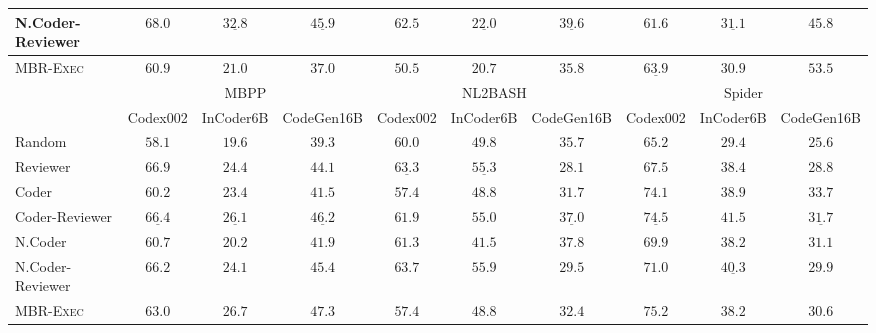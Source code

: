 \documentclass[nohyperref]{article}
\theoremstyle{plain}
\theoremstyle{definition}
\theoremstyle{remark}
\begin{document}
\begin{table*}[]
{\begin{tabular}{lccccccccc}
N.Coder-Reviewer  &     $\mathbf{68.0}$ &  $\underline{32.8}$ &  $\underline{45.9}$ &     $\mathbf{62.5}$ &  $\underline{22.0}$ &  $\underline{39.6}$ &              $61.6$ &  $\underline{31.1}$ &              $45.8$ \\
\midrule
MBR-\textsc{Exec} &              $60.9$ &              $21.0$ &              $37.0$ &              $50.5$ &              $20.7$ &              $35.8$ &  $\underline{63.9}$ &              $30.9$ &     $\mathbf{53.5}$ \\
\midrule
{} & \multicolumn{3}{c}{MBPP} & \multicolumn{3}{c}{NL2BASH} & \multicolumn{3}{c}{Spider} \\
\cmidrule(lr){2-4}\cmidrule(lr){5-7}\cmidrule(lr){8-10}
{} &            Codex002 &           InCoder6B &          CodeGen16B &            Codex002 &           InCoder6B &          CodeGen16B &            Codex002 &           InCoder6B &          CodeGen16B \\
\midrule
Random            &              $58.1$ &              $19.6$ &              $39.3$ &              $60.0$ &              $49.8$ &              $35.7$ &              $65.2$ &              $29.4$ &              $25.6$ \\
Reviewer          &     $\mathbf{66.9}$ &              $24.4$ &              $44.1$ &  $\underline{63.3}$ &  $\underline{55.3}$ &              $28.1$ &              $67.5$ &              $38.4$ &              $28.8$ \\
\midrule
Coder             &              $60.2$ &              $23.4$ &              $41.5$ &              $57.4$ &              $48.8$ &              $31.7$ &              $74.1$ &              $38.9$ &     $\mathbf{33.7}$ \\
Coder-Reviewer    &  $\underline{66.4}$ &  $\underline{26.1}$ &  $\underline{46.2}$ &              $61.9$ &              $55.0$ &  $\underline{37.0}$ &  $\underline{74.5}$ &     $\mathbf{41.5}$ &  $\underline{31.7}$ \\
\midrule
N.Coder           &              $60.7$ &              $20.2$ &              $41.9$ &              $61.3$ &              $41.5$ &     $\mathbf{37.8}$ &              $69.9$ &              $38.2$ &              $31.1$ \\
N.Coder-Reviewer  &              $66.2$ &              $24.1$ &              $45.4$ &     $\mathbf{63.7}$ &     $\mathbf{55.9}$ &              $29.5$ &              $71.0$ &  $\underline{40.3}$ &              $29.9$ \\
\midrule
MBR-\textsc{Exec} &              $63.0$ &     $\mathbf{26.7}$ &     $\mathbf{47.3}$ &              $57.4$ &              $48.8$ &              $32.4$ &     $\mathbf{75.2}$ &              $38.2$ &              $30.6$ \\
\bottomrule
\end{tabular}







}
\end{table*}
\end{document}
